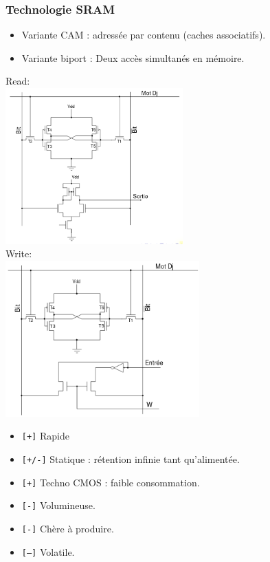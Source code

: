 \documentclass[10pt]{article}
\begin{document}
\begin{multicols}{2}
  \subsubsection{Technologie SRAM}
  \begin{itemize}
    \itemsep0em
    \item Variante CAM : adressée par contenu (caches associatifs).
    \item Variante biport : Deux accès simultanés en mémoire.
  \end{itemize}
  Read:\\
  \includegraphics[height=6cm]{./sram_read.png}\\
  Write:\\
  \includegraphics[height=6cm]{./sram_write.png}
  \begin{itemize}
    \itemsep0em
    \item \texttt{[+]} Rapide
    \item \texttt{[+/-]} Statique : rétention infinie tant qu'alimentée.
    \item \texttt{[+]} Techno CMOS : faible consommation.
    \item \texttt{[-]} Volumineuse.
    \item \texttt{[-]} Chère à produire.
    \item \texttt{[--]} Volatile.
  \end{itemize}

\end{multicols}
\end{document}
